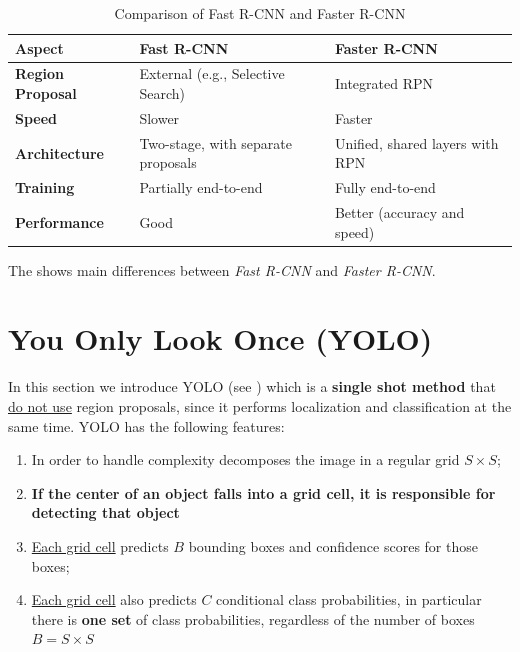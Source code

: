 \begin{table}
    \centering
    \begin{tabular}{@{}l l l @{}}
    \toprule
    \textbf{Aspect}           & \textbf{Fast R-CNN}                      & \textbf{Faster R-CNN}                  \\ \midrule
    \textbf{Region Proposal}  & External (e.g., Selective Search)        & Integrated RPN                         \\
    \midrule 
    \textbf{Speed}            & Slower                                   & Faster                                 \\  \midrule
    \textbf{Architecture}     & Two-stage, with separate proposals       & Unified, shared layers with RPN        \\ \midrule
    \textbf{Training}         & Partially end-to-end                     & Fully end-to-end                       \\ \midrule
    \textbf{Performance}      & Good                                     & Better (accuracy and speed)            \\ \bottomrule
    \end{tabular}
    \caption{Comparison of Fast R-CNN and Faster R-CNN}
    \label{tab:comparison}
    \end{table}
\noindent
The  shows main differences between \textit{Fast R-CNN} and \textit{Faster R-CNN}.


\section{You Only Look Once (YOLO)}
In this section we introduce YOLO (see  \cite{redmon2016you}) which is a \textbf{single shot method} that \underline{do not use} region proposals, since it performs localization and classification at the same time. YOLO has the following features: 
\begin{enumerate}
    \itemsep-0.3em
    \item In order to handle complexity decomposes the image in a regular grid $S \times S$; 
    \item \textbf{If the center of an object falls into a grid cell, it is responsible for detecting that object}
    \item \underline{Each grid cell} predicts $B$ bounding boxes and confidence scores for those boxes; 
    \item \underline{Each grid cell} also predicts $C$ conditional class probabilities, in particular there is \textbf{one set} of class probabilities, regardless of the number of boxes $B=S\times S$
\end{enumerate}
 
